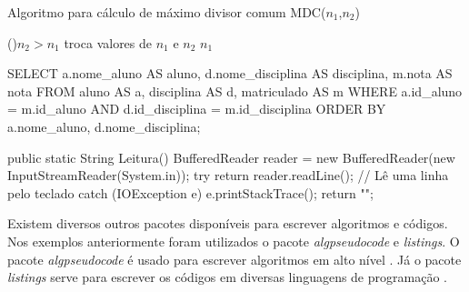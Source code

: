 \begin{algoritmo}
\caption{Algoritmo para cálculo de máximo divisor comum MDC($n_1$,$n_2$)}
\label{algoritmo:mdc1}

 \If(){$n_2 > n_1$}
   {troca valores de $n_1$ e $n_2$}
 \Return $n_1$
\end{algoritmo}

\begin{codigo}[caption = {Consulta SQL}, label={codigo:notas_alunos},language=SQL, breaklines=true]
SELECT a.nome_aluno AS aluno,
       d.nome_disciplina AS disciplina,
       m.nota AS nota
FROM aluno AS a,
     disciplina AS d,
     matriculado AS m
WHERE a.id_aluno = m.id_aluno
  AND d.id_disciplina = m.id_disciplina
ORDER BY a.nome_aluno, d.nome_disciplina;
\end{codigo}

\begin{codigo}[caption={Subrotina para obter uma entrada do usuário}, label={codigo:metodo_leitura}, language=Java, breaklines=true]
public static String Leitura(){
    BufferedReader reader = new BufferedReader(new InputStreamReader(System.in));
    try {
        return reader.readLine(); // Lê uma linha pelo teclado
    } catch (IOException e) {
        e.printStackTrace();
        return "";
    }
}
\end{codigo}

Existem diversos outros pacotes disponíveis para escrever algoritmos e códigos. Nos exemplos anteriormente foram utilizados o pacote \textit{algpseudocode} e \textit{listings}. O pacote \textit{algpseudocode} é usado para escrever algoritmos em alto nível \cite{janos:2005:algpseudocode}. Já o pacote \textit{listings} serve para escrever os códigos em diversas linguagens de programação \cite{moses:2006:listings}.

